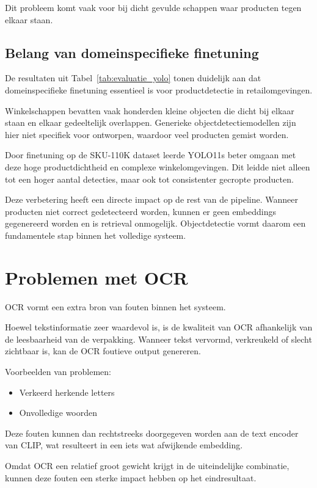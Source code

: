 Dit probleem komt vaak voor bij dicht gevulde schappen waar producten tegen elkaar staan.

\subsection{Belang van domeinspecifieke finetuning}

De resultaten uit Tabel~\ref{tab:evaluatie_yolo} tonen duidelijk aan dat domeinspecifieke finetuning essentieel is voor productdetectie in retailomgevingen.

Winkelschappen bevatten vaak honderden kleine objecten die dicht bij elkaar staan en elkaar gedeeltelijk overlappen. Generieke objectdetectiemodellen zijn hier niet specifiek voor ontworpen, waardoor veel producten gemist worden.

Door finetuning op de SKU-110K dataset leerde YOLO11s beter omgaan met deze hoge productdichtheid en complexe winkelomgevingen. Dit leidde niet alleen tot een hoger aantal detecties, maar ook tot consistenter gecropte producten.

Deze verbetering heeft een directe impact op de rest van de pipeline. Wanneer producten niet correct gedetecteerd worden, kunnen er geen embeddings gegenereerd worden en is retrieval onmogelijk. Objectdetectie vormt daarom een fundamentele stap binnen het volledige systeem.

\section{Problemen met OCR}

OCR vormt een extra bron van fouten binnen het systeem.

Hoewel tekstinformatie zeer waardevol is, is de kwaliteit van OCR afhankelijk van de leesbaarheid van de verpakking. Wanneer tekst vervormd, verkreukeld of slecht zichtbaar is, kan de OCR foutieve output genereren.

Voorbeelden van problemen:
\begin{itemize}
    \item Verkeerd herkende letters
    \item Onvolledige woorden
\end{itemize}

Deze fouten kunnen dan rechtstreeks doorgegeven worden aan de text encoder van CLIP, wat resulteert in een iets wat afwijkende embedding.

Omdat OCR een relatief groot gewicht krijgt in de uiteindelijke combinatie, kunnen deze fouten een sterke impact hebben op het eindresultaat.


